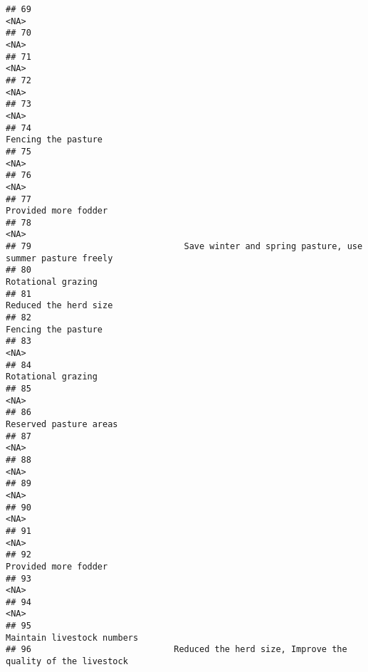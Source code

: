 \documentclass[
]{article}
\begin{document}
\begin{verbatim}
## 69                                                                                   <NA>
## 70                                                                                   <NA>
## 71                                                                                   <NA>
## 72                                                                                   <NA>
## 73                                                                                   <NA>
## 74                                                                    Fencing the pasture
## 75                                                                                   <NA>
## 76                                                                                   <NA>
## 77                                                                   Provided more fodder
## 78                                                                                   <NA>
## 79                              Save winter and spring pasture, use summer pasture freely
## 80                                                                     Rotational grazing
## 81                                                                  Reduced the herd size
## 82                                                                    Fencing the pasture
## 83                                                                                   <NA>
## 84                                                                     Rotational grazing
## 85                                                                                   <NA>
## 86                                                                 Reserved pasture areas
## 87                                                                                   <NA>
## 88                                                                                   <NA>
## 89                                                                                   <NA>
## 90                                                                                   <NA>
## 91                                                                                   <NA>
## 92                                                                   Provided more fodder
## 93                                                                                   <NA>
## 94                                                                                   <NA>
## 95                                                             Maintain livestock numbers
## 96                            Reduced the herd size, Improve the quality of the livestock

\end{verbatim}
\end{document}
